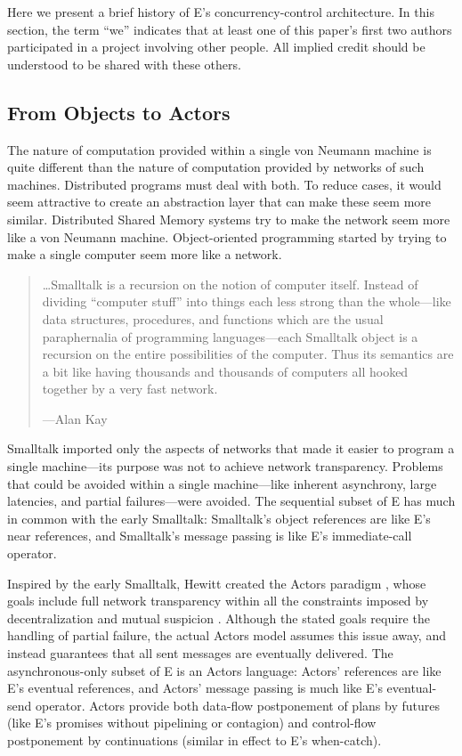 \documentclass{llncs}
\begin{document}
Here we present a brief history of E's concurrency-control
architecture. In this section, the term ``we'' indicates that at least
one of this paper's first two authors participated in a project
involving other people. All implied credit should be understood to be
shared with these others.

\subsection{From Objects to Actors}

The nature of computation provided within a single von Neumann machine
is quite different than the nature of computation provided by networks
of such machines. Distributed programs must deal with both. To reduce
cases, it would seem attractive to create an abstraction layer that
can make these seem more similar. Distributed Shared Memory systems
\cite{dsm-survey} try to make the network seem more like a von Neumann
machine. Object-oriented programming started by trying to make a
single computer seem more like a network.
%
\begin{quotation}
\ldots Smalltalk is a recursion on the notion of computer
itself. Instead of dividing ``computer stuff'' into things each less
strong than the whole---like data structures, procedures, and
functions which are the usual paraphernalia of programming
languages---each Smalltalk object is a recursion on the entire
possibilities of the computer. Thus its semantics are a bit like
having thousands and thousands of computers all hooked together by a
very fast network.
\begin{flushright}
---Alan Kay \cite{kay:smallhistory}
\end{flushright}
\end{quotation}
%
Smalltalk imported only the aspects of networks that made it easier to
program a single machine---its purpose was not to achieve network
transparency. Problems that could be avoided within a single
machine---like inherent asynchrony, large latencies, and partial
failures---were avoided. The sequential subset of E
has much in common with the early Smalltalk: Smalltalk's object
references are like E's near references, and Smalltalk's message
passing is like E's immediate-call operator.

 Inspired by the early Smalltalk, Hewitt created the
Actors paradigm \cite{hewitt:actors}, whose goals include full network
transparency within all the constraints imposed by decentralization
and mutual suspicion \cite{hewitt:challenge}. Although the stated
goals require the handling of partial failure, the actual Actors model
assumes this issue away, and instead guarantees that all sent messages
are eventually delivered. The asynchronous-only subset of E is an
Actors language: Actors' references are like E's eventual references,
and Actors' message passing is much like E's eventual-send
operator. Actors provide both data-flow postponement of plans by
futures (like E's promises without pipelining or contagion) and
control-flow postponement by continuations (similar in effect to E's
when-catch).
\end{document}
